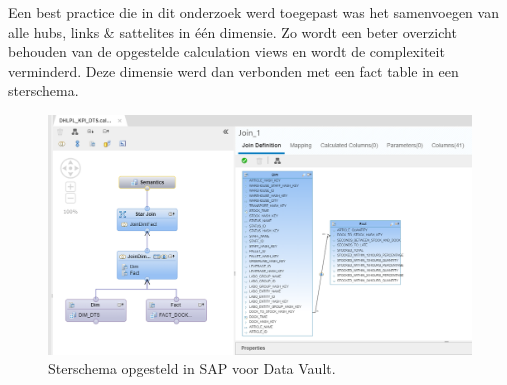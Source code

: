 Een best practice die in dit onderzoek werd toegepast was het samenvoegen van alle hubs, links \& sattelites in één dimensie. Zo wordt een beter overzicht behouden van de opgestelde calculation views en wordt de complexiteit verminderd. Deze dimensie werd dan verbonden met een fact table in een sterschema. 

\begin{figure}[h]
	\centering
	\includegraphics[scale=0.5]{../images/DV_FG_datamart.png}
	\caption{Sterschema opgesteld in SAP voor Data Vault.}
	\label{fig:dvdm}
\end{figure}
